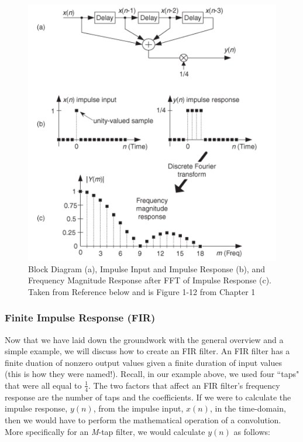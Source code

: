 \begin{figure}[h!]
	\centering
	\includegraphics[scale = .6]{impulse.png} %
	\caption{Block Diagram (a), Impulse Input and Impulse Response (b), and Frequency Magnitude Response after FFT of Impulse Response (c).  Taken from Reference \cite{lyons:intro} below and is Figure 1-12 from Chapter 1}
	\label{fig:impulse}
\end{figure}   

\subsubsection{Finite Impulse Response (FIR)}

Now that we have laid down the groundwork with the general overview and a simple example, we will discuss how to create an FIR filter.  An FIR filter has a finite duation of nonzero output values given a finite duration of input values (this is how they were named!).  Recall, in our example above, we used four ``taps" that were all equal to $\frac{1}{4}$.  The two factors that affect an FIR filter's frequency response are the number of taps and the coefficients\cite{lyons:intro}.  If we were to calculate the impulse response, $y(n)$, from the impulse input, $x(n)$, in the time-domain, then we would have to perform the mathematical operation of a convolution.  More specifically for an \textit{M}-tap filter, we would calculate $y(n)$ as follows: 

